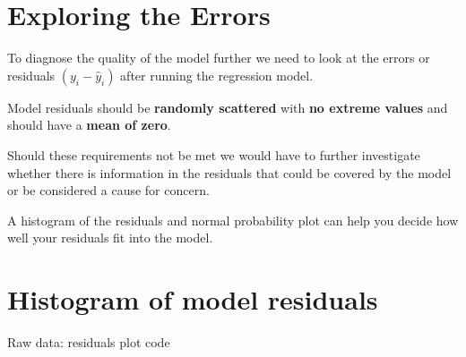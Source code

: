 \documentclass[
]{article}
\newenvironment{Shaded}{\begin{snugshade}}{\end{snugshade}}
\newcommand{\AttributeTok}[1]{\textcolor[rgb]{0.13,0.29,0.53}{#1}}
\newcommand{\CommentTok}[1]{\textcolor[rgb]{0.56,0.35,0.01}{\textit{#1}}}
\newcommand{\DecValTok}[1]{\textcolor[rgb]{0.00,0.00,0.81}{#1}}
\newcommand{\FunctionTok}[1]{\textcolor[rgb]{0.13,0.29,0.53}{\textbf{#1}}}
\newcommand{\NormalTok}[1]{#1}
\newcommand{\OtherTok}[1]{\textcolor[rgb]{0.56,0.35,0.01}{#1}}
\newcommand{\SpecialCharTok}[1]{\textcolor[rgb]{0.81,0.36,0.00}{\textbf{#1}}}
\newcommand{\StringTok}[1]{\textcolor[rgb]{0.31,0.60,0.02}{#1}}
\begin{document}
\hypertarget{exploring-the-errors}{%
\section{Exploring the Errors}\label{exploring-the-errors}}

To diagnose the quality of the model further we need to look at the
errors or residuals \((y_{i} - \hat{y}_{i})\) after running the
regression model.

Model residuals should be \textbf{randomly scattered} with \textbf{no
extreme values} and should have a \textbf{mean of zero}.

Should these requirements not be met we would have to further
investigate whether there is information in the residuals that could be
covered by the model or be considered a cause for concern.

A histogram of the residuals and normal probability plot can help you
decide how well your residuals fit into the model.

\hypertarget{histogram-of-model-residuals}{%
\section{Histogram of model
residuals}\label{histogram-of-model-residuals}}

Raw data: residuals plot code

\begin{Shaded}
\end{Shaded}
\end{document}
